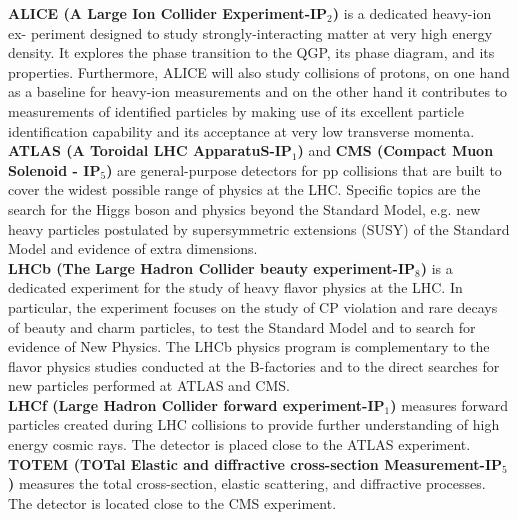 \textbf{ALICE (A Large Ion Collider Experiment-IP$_{2}$)} \cite{cite:proposalALICE} is a dedicated heavy-ion ex- periment designed to study strongly-interacting matter at very high energy density. It explores the phase transition to the QGP, its phase diagram, and its properties. Furthermore, ALICE will also study collisions of protons, on one hand as a baseline for heavy-ion measurements and on the other hand it contributes to measurements of identified particles by making use of its excellent particle identification capability and its acceptance at very low transverse momenta. \\

\textbf{ATLAS (A Toroidal LHC ApparatuS-IP$_{1}$)} and \textbf{CMS (Compact Muon Solenoid - IP$_{5}$) }\cite{cite:proposalATLAS}\cite{cite:proposalCMS} are general-purpose detectors for pp collisions that are built to cover the widest possible range of physics at the LHC. Specific topics are the search for the Higgs boson and physics beyond the Standard Model, e.g. new heavy particles postulated by supersymmetric extensions (SUSY) of the Standard Model and evidence of extra dimensions.\\

\textbf{LHCb (The Large Hadron Collider beauty experiment-IP$_{8}$)} \cite{cite:proposalLHCb} is a dedicated experiment for the study of heavy flavor physics at the LHC. In particular, the experiment focuses on the study of CP violation and rare decays of beauty and charm particles, to test the Standard Model and to search for evidence of New Physics. The LHCb physics program is complementary to the flavor physics studies conducted at the B-factories and to the direct searches for new particles performed at ATLAS and CMS. \\

\textbf{LHCf (Large Hadron Collider forward experiment-IP$_{1}$)} \cite{cite:proposalLHCf} measures forward particles created during LHC collisions to provide further understanding of high energy cosmic rays. The detector is placed close to the ATLAS experiment. \\

\textbf{TOTEM (TOTal Elastic and diffractive cross-section Measurement-IP$_{5}$)} \cite{cite:proposalTOTEM} measures the total cross-section, elastic scattering, and diffractive processes. The detector is located close to the CMS experiment. \\


